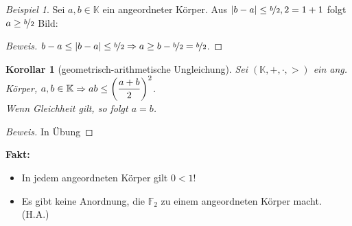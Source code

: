 \documentclass[12pt,a4paper,titlepage]{article} %
\newtheorem{kor}{Korollar}
\theoremstyle{definition}
\theoremstyle{remark}
\newtheorem*{bsp}{Beispiel}
\newenvironment{bew}{\begin{proof}[Beweis]}{\end{proof}}
\begin{document}
\begin{bsp}
	Sei $a,b\in\mathbb{K}$ ein angeordneter Körper. Aus $|b-a|\leq \nicefrac{b}{2}, 2 = 1+1$ folgt $a \geq \nicefrac{b}{2}$
	Bild: %
	\begin{bew}
		$b-a \leq |b-a| \leq \nicefrac{b}{2} \Rightarrow a \geq b - \nicefrac{b}{2} = \nicefrac{b}{2}$.
	\end{bew}
\end{bsp}
\begin{kor}[\glqq geometrisch-arithmetische Ungleichung\grqq]
	Sei $(\mathbb{K},+,\cdot,>)$ ein ang. Körper, $a,b\in\mathbb{K}\\
	\Rightarrow ab \leq \left( \dfrac{a+b}{2}\right)^2$.\\
	Wenn Gleichheit gilt, so folgt $a=b$.
\end{kor}
\begin{bew}
	In Übung
\end{bew}
\textbf{Fakt:}
\begin{itemize}
	\item In jedem angeordneten Körper gilt $0<1$!
	\item Es gibt keine Anordnung, die $\mathbb{F}_2$ zu einem angeordneten Körper macht. (H.A.)
\end{itemize}
\end{document}
